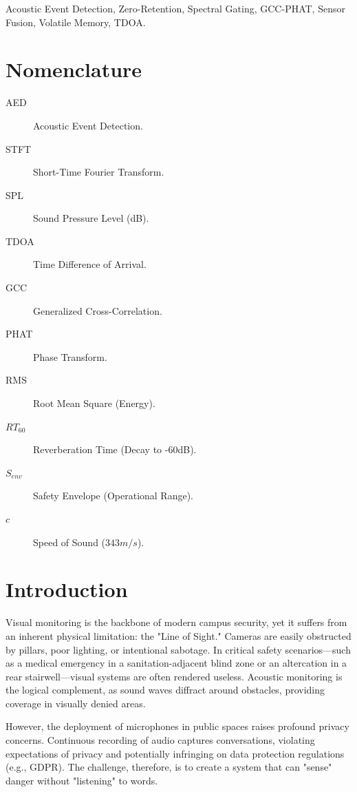 \documentclass[conference]{IEEEtran}
\begin{document}
\begin{IEEEkeywords}
Acoustic Event Detection, Zero-Retention, Spectral Gating, GCC-PHAT, Sensor Fusion, Volatile Memory, TDOA.
\end{IEEEkeywords}

\section*{Nomenclature}
\begin{description}
    \item[AED] Acoustic Event Detection.
    \item[STFT] Short-Time Fourier Transform.
    \item[SPL] Sound Pressure Level (dB).
    \item[TDOA] Time Difference of Arrival.
    \item[GCC] Generalized Cross-Correlation.
    \item[PHAT] Phase Transform.
    \item[RMS] Root Mean Square (Energy).
    \item[$RT_{60}$] Reverberation Time (Decay to -60dB).
    \item[$S_{env}$] Safety Envelope (Operational Range).
    \item[$c$] Speed of Sound ($343 m/s$).
\end{description}

\section{Introduction}
Visual monitoring is the backbone of modern campus security, yet it suffers from an inherent physical limitation: the "Line of Sight." Cameras are easily obstructed by pillars, poor lighting, or intentional sabotage. In critical safety scenarios—such as a medical emergency in a sanitation-adjacent blind zone or an altercation in a rear stairwell—visual systems are often rendered useless. Acoustic monitoring is the logical complement, as sound waves diffract around obstacles, providing coverage in visually denied areas.

However, the deployment of microphones in public spaces raises profound privacy concerns. Continuous recording of audio captures conversations, violating expectations of privacy and potentially infringing on data protection regulations (e.g., GDPR). The challenge, therefore, is to create a system that can "sense" danger without "listening" to words.
\end{document}
